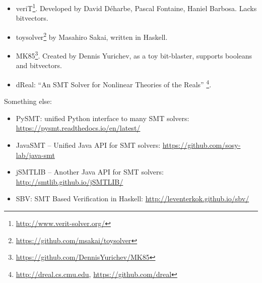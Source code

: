 \begin{itemize}
\item veriT\footnote{\url{http://www.verit-solver.org/}}.
Developed by David Déharbe, Pascal Fontaine, Haniel Barbosa.
Lacks bitvectors.

\item toysolver\footnote{\url{https://github.com/msakai/toysolver}} by Masahiro Sakai, written in Haskell.

\item MK85\footnote{\url{https://github.com/DennisYurichev/MK85}}.
Created by Dennis Yurichev, as a toy bit-blaster, supports booleans and bitvectors.

\item dReal: ``An SMT Solver for Nonlinear Theories of the Reals''
\footnote{\url{http://dreal.cs.cmu.edu}, \url{https://github.com/dreal}}.

\end{itemize}

Something else:

\begin{itemize}

\item PySMT: unified Python interface to many SMT solvers: \url{https://pysmt.readthedocs.io/en/latest/}

\item JavaSMT -- Unified Java API for SMT solvers: \url{https://github.com/sosy-lab/java-smt}

\item jSMTLIB -- Another Java API for SMT solvers: \url{http://smtlib.github.io/jSMTLIB/}

\item SBV: SMT Based Verification in Haskell: \url{http://leventerkok.github.io/sbv/}

\end{itemize}

